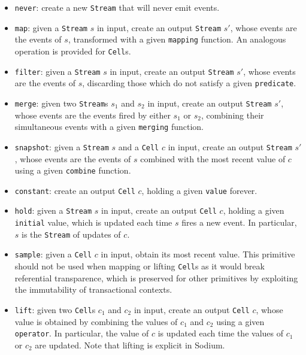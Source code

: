 \begin{itemize}
  \item \texttt{never}: create a new \texttt{Stream} that will never emit
        events.
  \item \texttt{map}: given a \texttt{Stream} $s$ in input, create an output
        \texttt{Stream} $s'$, whose events are the events of $s$, transformed
        with a given \texttt{mapping} function. An analogous operation is
        provided for \texttt{Cell}s.
  \item \texttt{filter}: given a \texttt{Stream} $s$ in input, create an output
        \texttt{Stream} $s'$, whose events are the events of $s$, discarding
        those which do not satisfy a given \texttt{predicate}.
  \item \texttt{merge}: given two \texttt{Stream}s $s_1$ and $s_2$ in input,
        create an output \texttt{Stream} $s'$, whose events are the events
        fired by either $s_1$ or $s_2$, combining their simultaneous events
        with a given \texttt{merging} function.
  \item \texttt{snapshot}: given a \texttt{Stream} $s$ and a \texttt{Cell} $c$
        in input, create an output \texttt{Stream} $s'$, whose events are the
        events of $s$ combined with the most recent value of $c$ using a given
        \texttt{combine} function.
  \item \texttt{constant}: create an output \texttt{Cell} $c$, holding a given
        \texttt{value} forever.
  \item \texttt{hold}: given a \texttt{Stream} $s$ in input, create an output
        \texttt{Cell} $c$, holding a given \texttt{initial} value, which is
        updated each time $s$ fires a new event. In particular, $s$ is the
        \texttt{Stream} of updates of $c$.
  \item \texttt{sample}: given a \texttt{Cell} $c$ in input, obtain its most
        recent value. This primitive should not be used when mapping or lifting
        \texttt{Cell}s as it would break referential transparence, which is
        preserved for other primitives by exploiting the immutability of
        transactional contexts.
  \item \texttt{lift}: given two \texttt{Cell}s $c_1$ and $c_2$ in input,
        create an output \texttt{Cell} $c$, whose value is obtained by
        combining the values of $c_1$ and $c_2$ using a given \texttt{operator}.
        In particular, the value of $c$ is updated each time the values of
        $c_1$ or $c_2$ are updated. Note that lifting is explicit in Sodium.
\end{itemize}

